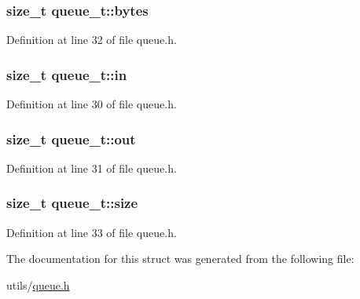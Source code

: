 \hypertarget{structqueue__t_a58398d4ee60bc90ffba2bc3488fe185b}{
\subsubsection[{bytes}]{\setlength{\rightskip}{0pt plus 5cm}size\-\_\-t queue\-\_\-t\-::bytes}}\label{structqueue__t_a58398d4ee60bc90ffba2bc3488fe185b}


Definition at line 32 of file queue.\-h.

\hypertarget{structqueue__t_a7a6832e36c70a1db7fddc93fb6be9d63}{
\subsubsection[{in}]{\setlength{\rightskip}{0pt plus 5cm}size\-\_\-t queue\-\_\-t\-::in}}\label{structqueue__t_a7a6832e36c70a1db7fddc93fb6be9d63}


Definition at line 30 of file queue.\-h.

\hypertarget{structqueue__t_a8f6e1c623d2ceed398a71a0aab93b0fa}{
\subsubsection[{out}]{\setlength{\rightskip}{0pt plus 5cm}size\-\_\-t queue\-\_\-t\-::out}}\label{structqueue__t_a8f6e1c623d2ceed398a71a0aab93b0fa}


Definition at line 31 of file queue.\-h.

\hypertarget{structqueue__t_a83a13b888f9d4ef127d706559818b779}{
\subsubsection[{size}]{\setlength{\rightskip}{0pt plus 5cm}size\-\_\-t queue\-\_\-t\-::size}}\label{structqueue__t_a83a13b888f9d4ef127d706559818b779}


Definition at line 33 of file queue.\-h.



The documentation for this struct was generated from the following file\-:\begin{DoxyCompactItemize}
\item 
utils/\hyperlink{queue_8h}{queue.\-h}\end{DoxyCompactItemize}
